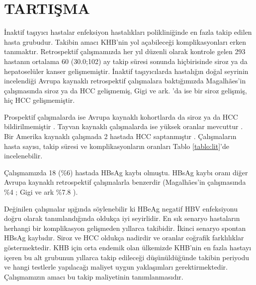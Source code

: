 


\section{TARTIŞMA}


İnaktif taşıyıcı hastalar enfeksiyon hastalıkları polikliniğinde en fazla takip edilen hasta grubudur. Takibin amacı KHB'nin yol açabileceği komplikasyonları erken tanımaktır. Retrospektif çalışmamızda her yıl düzenli olarak kontrole gelen 293 hastanın ortalama 60 (30.0;102) ay takip süresi sonunda hiçbirisinde  siroz ya da hepatoselüler kanser gelişmemiştir. İnaktif taşıyıcılarda hastalığın doğal seyrinin incelendiği Avrupa kaynaklı retrospektif çalışmalara baktığımızda Magalhães'in çalışmasında \cite{magalhaes2015hepatitis} siroz ya da HCC gelişmemiş, Gigi ve ark. \cite{gigi2007long}'da ise bir siroz gelişmiş, hiç HCC gelişmemiştir. 

Prospektif çalışmalarda ise Avrupa kaynaklı kohortlarda da siroz ya da HCC bildirilmemiştir \cite{martinot2002serum,oliveri2017long,zacharakis2008role}. Tayvan kaynaklı çalışmalarda ise yüksek oranlar mevcuttur \cite{chen2010carriers,chu2007spontaneous,hsu2002long}. Bir Amerika kaynaklı çalışmada 2 hastada HCC saptanmıştır \cite{tong2013hepatitis}. Çalışmaların hasta sayısı, takip süresi ve komplikasyonların oranları Tablo \ref{tablo:lit}'de incelenebilir.

Çalışmamızda 18 (\%6) hastada HBsAg kaybı olmuştu. HBsAg kaybı oranı diğer Avrupa kaynaklı retrospektif çalışmalarla benzerdir (Magalhães'in çalışmasında \%4 \cite{magalhaes2015hepatitis}; Gigi ve ark \%7.8 \cite{gigi2007long}).  

Değinilen çalışmalar ışığında söylenebilir ki HBeAg negatif HBV enfeksiyonu doğru olarak tanımlandığında oldukça iyi seyirlidir. En sık senaryo hastaların herhangi bir komplikasyon gelişmeden yıllarca takibidir. İkinci senaryo spontan HBsAg kaybıdır. Siroz ve HCC oldukça nadirdir ve oranlar coğrafik farklılıklar göstermektedir. KHB için orta endemik olan ülkemizde KHB'nin en fazla hastayı içeren bu alt grubunun yıllarca takip edileceği düşünüldüğünde takibin periyodu ve hangi testlerle yapılacağı maliyet uygun yaklaşımları gerektirmektedir. Çalışmamızın amacı bu takip maliyetinin tanımlanmasıdır.

